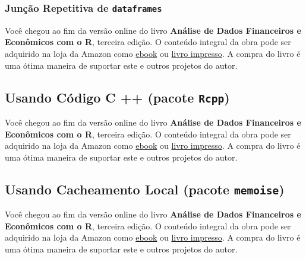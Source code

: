 \documentclass[
  11pt,
]{book}
\newenvironment{pleasebuyit}
{\begin{noteblock}
		
	} {\end{noteblock}}
\begin{document}
\hypertarget{junuxe7uxe3o-repetitiva-de-dataframes}{%
\subsubsection{\texorpdfstring{Junção Repetitiva de \texttt{dataframes}}{Junção Repetitiva de dataframes}}\label{junuxe7uxe3o-repetitiva-de-dataframes}}

\begin{pleasebuyit}
Você chegou ao fim da versão online do livro \textbf{Análise de Dados
Financeiros e Econômicos com o R}, terceira edição. O conteúdo integral
da obra pode ser adquirido na loja da Amazon como
\href{https://www.amazon.com.br/dp/B08WNC27ZY}{ebook} ou
\href{https://www.amazon.com/dp/B08WP8CCDB}{livro impresso}. A compra do
livro é uma ótima maneira de suportar este e outros projetos do autor.
\end{pleasebuyit}

\hypertarget{usando-cuxf3digo-c-pacote-rcpp}{%
\subsection{\texorpdfstring{Usando Código C ++ (pacote \texttt{Rcpp})}{Usando Código C ++ (pacote Rcpp)}}\label{usando-cuxf3digo-c-pacote-rcpp}}

\begin{pleasebuyit}
Você chegou ao fim da versão online do livro \textbf{Análise de Dados
Financeiros e Econômicos com o R}, terceira edição. O conteúdo integral
da obra pode ser adquirido na loja da Amazon como
\href{https://www.amazon.com.br/dp/B08WNC27ZY}{ebook} ou
\href{https://www.amazon.com/dp/B08WP8CCDB}{livro impresso}. A compra do
livro é uma ótima maneira de suportar este e outros projetos do autor.
\end{pleasebuyit}

\hypertarget{usando-cacheamento-local-pacote-memoise}{%
\subsection{\texorpdfstring{Usando Cacheamento Local (pacote \texttt{memoise})}{Usando Cacheamento Local (pacote memoise)}}\label{usando-cacheamento-local-pacote-memoise}}

\begin{pleasebuyit}
Você chegou ao fim da versão online do livro \textbf{Análise de Dados
Financeiros e Econômicos com o R}, terceira edição. O conteúdo integral
da obra pode ser adquirido na loja da Amazon como
\href{https://www.amazon.com.br/dp/B08WNC27ZY}{ebook} ou
\href{https://www.amazon.com/dp/B08WP8CCDB}{livro impresso}. A compra do
livro é uma ótima maneira de suportar este e outros projetos do autor.
\end{pleasebuyit}
\end{document}
